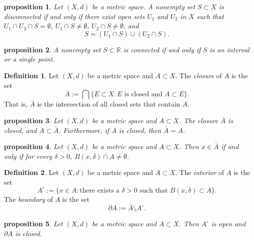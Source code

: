 \documentclass{article}
\newtheorem{proposition}{Proposition}[section]
\newtheorem{proposition}{proposition}[section]
\theoremstyle{definition}
\newtheorem{definition}{Definition}[section]
\theoremstyle{remark}
\begin{document}
\begin{proposition} \label{prop:disconnected_set}
Let \( (X, d) \) be a metric space. A nonempty set \( S \subset X \) is disconnected if and only if there exist open sets \( U_1 \) and \( U_2 \) in \( X \) such that \( U_1 \cap U_2 \cap S = \emptyset \), \( U_1 \cap S \neq \emptyset \), \( U_2 \cap S \neq \emptyset \), and
\[
S = (U_1 \cap S) \cup (U_2 \cap S).
\]
\end{proposition}

\begin{proposition} \label{prop:connected_real_set}
A nonempty set \( S \subset \mathbb{R} \) is connected if and only if \( S \) is an interval or a single point.
\end{proposition}

\begin{definition} \label{def:closure}
Let \( (X, d) \) be a metric space and \( A \subset X \). The \textit{closure} of \( A \) is the set
\[
\bar{A} := \bigcap \{E \subset X : E \text{ is closed and } A \subset E\}.
\]
That is, \( \bar{A} \) is the intersection of all closed sets that contain \( A \).
\end{definition}

\begin{proposition} \label{prop:closure_properties}
Let \( (X, d) \) be a metric space and \( A \subset X \). The closure \( \bar{A} \) is closed, and \( A \subset \bar{A} \). Furthermore, if \( A \) is closed, then \( \bar{A} = A \).
\end{proposition}

\begin{proposition} \label{prop:closure_characterization}
Let \( (X, d) \) be a metric space and \( A \subset X \). Then \( x \in \bar{A} \) if and only if for every \( \delta > 0 \), \( B(x, \delta) \cap A \neq \emptyset \).
\end{proposition}

\begin{definition} \label{def:interior_boundary}
Let \( (X, d) \) be a metric space and \( A \subset X \). The \textit{interior} of \( A \) is the set
\[
A^{\circ} := \{ x \in A : \text{there exists a } \delta > 0 \text{ such that } B(x, \delta) \subset A \}.
\]
The \textit{boundary} of \( A \) is the set
\[
\partial A := \bar{A} \setminus A^{\circ}.
\]
\end{definition}

\begin{proposition} \label{prop:interior_boundary}
Let \( (X, d) \) be a metric space and \( A \subset X \). Then \( A^{\circ} \) is open and \( \partial A \) is closed.
\end{proposition}
\end{document}
